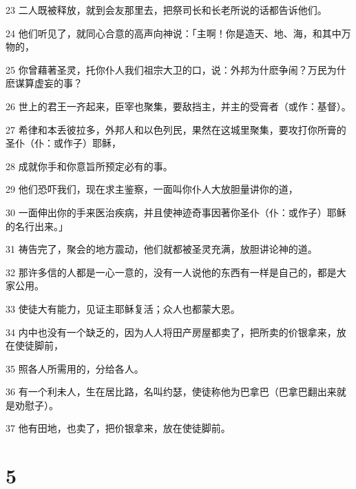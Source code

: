 \par 23 二人既被释放，就到会友那里去，把祭司长和长老所说的话都告诉他们。
\par 24 他们听见了，就同心合意的高声向神说：「主啊！你是造天、地、海，和其中万物的，
\par 25 你曾藉著圣灵，托你仆人我们祖宗大卫的口，说：外邦为什麽争闹？万民为什麽谋算虚妄的事？
\par 26 世上的君王一齐起来，臣宰也聚集，要敌挡主，并主的受膏者（或作：基督）。
\par 27 希律和本丢彼拉多，外邦人和以色列民，果然在这城里聚集，要攻打你所膏的圣仆（仆：或作子）耶稣，
\par 28 成就你手和你意旨所预定必有的事。
\par 29 他们恐吓我们，现在求主鉴察，一面叫你仆人大放胆量讲你的道，
\par 30 一面伸出你的手来医治疾病，并且使神迹奇事因著你圣仆（仆：或作子）耶稣的名行出来。」
\par 31 祷告完了，聚会的地方震动，他们就都被圣灵充满，放胆讲论神的道。
\par 32 那许多信的人都是一心一意的，没有一人说他的东西有一样是自己的，都是大家公用。
\par 33 使徒大有能力，见证主耶稣复活；众人也都蒙大恩。
\par 34 内中也没有一个缺乏的，因为人人将田产房屋都卖了，把所卖的价银拿来，放在使徒脚前，
\par 35 照各人所需用的，分给各人。
\par 36 有一个利未人，生在居比路，名叫约瑟，使徒称他为巴拿巴（巴拿巴翻出来就是劝慰子）。
\par 37 他有田地，也卖了，把价银拿来，放在使徒脚前。

\chapter{5}

